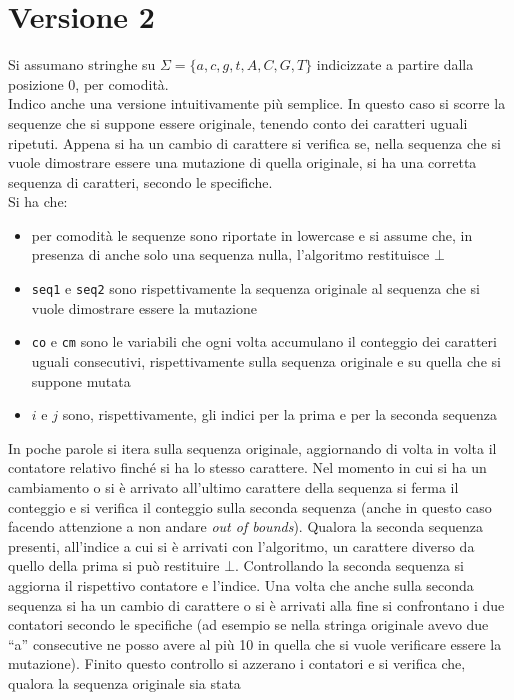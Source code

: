 \documentclass[a4paper,12pt, oneside]{book}
\begin{document}
\section{Versione 2}
Si assumano stringhe su $\Sigma=\{a,c,g,t,A,C,G,T\}$ indicizzate a partire dalla
posizione 0, per comodità.\\
Indico anche una versione intuitivamente più semplice. In questo caso si scorre
la sequenze che si suppone essere 
originale, tenendo conto dei caratteri uguali ripetuti. Appena si ha un cambio
di carattere si verifica se, nella sequenza che si vuole dimostrare essere una
mutazione di quella originale, si ha una corretta sequenza di caratteri, secondo
le specifiche.\\
Si ha che:
\begin{itemize}
  \item per comodità le sequenze sono riportate in lowercase e si assume che, in
  presenza di anche solo una sequenza nulla, l'algoritmo restituisce $\bot$
  \item \texttt{seq1} e \texttt{seq2} sono rispettivamente la sequenza originale
  al sequenza che si vuole dimostrare essere la mutazione
  \item \texttt{co} e \texttt{cm} sono le variabili che ogni volta
  accumulano il conteggio dei caratteri uguali consecutivi, rispettivamente
  sulla sequenza originale e su quella che si suppone mutata 
  \item $i$ e $j$ sono, rispettivamente, gli indici per la prima e per la
  seconda sequenza 
\end{itemize}
In poche parole si itera sulla sequenza originale, aggiornando di volta in volta
il contatore relativo finché si ha lo stesso carattere. Nel momento in cui si ha
un cambiamento o si è arrivato all'ultimo carattere della sequenza si ferma il
conteggio e si verifica il conteggio sulla seconda sequenza (anche in questo
caso facendo attenzione a non andare \textit{out of bounds}). Qualora la seconda
sequenza presenti, all'indice a cui si è arrivati con l'algoritmo, un carattere
diverso da quello della prima si può restituire $\bot$. Controllando la
seconda sequenza si aggiorna il rispettivo contatore e l'indice. Una volta che
anche sulla seconda sequenza si ha un cambio di carattere o si è arrivati alla
fine si confrontano i due contatori secondo le specifiche (ad esempio se nella
stringa originale avevo due ``a'' consecutive ne posso avere al più 10 in quella
che si vuole verificare essere la mutazione). Finito questo controllo si
azzerano i contatori e si verifica che, qualora la sequenza originale sia stata
\end{document}
